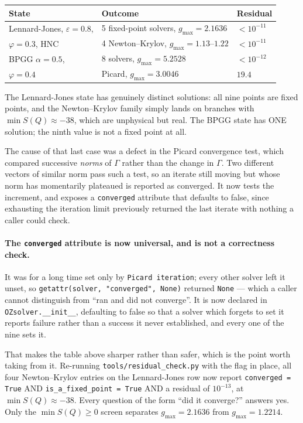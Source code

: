 \documentclass[11pt,a4paper]{article}
\newcommand{\code}[1]{\texttt{\hspace{0pt}#1}}
\begin{document}
\begin{center}\small
\begin{tabular}{lll}
\toprule
State & Outcome & Residual\\
\midrule
Lennard-Jones, $\varepsilon = 0.8$, & 5 fixed-point solvers, $g_{\max} = 2.1636$ & $< 10^{-11}$\\
$\varphi = 0.3$, HNC & 4 Newton--Krylov, $g_{\max} = 1.13$--$1.22$ & $< 10^{-11}$\\
\midrule
BPGG $\alpha = 0.5$, & 8 solvers, $g_{\max} = 5.2528$ & $< 10^{-12}$\\
$\varphi = 0.4$ & Picard, $g_{\max} = 3.0046$ & $\mathbf{19.4}$\\
\bottomrule
\end{tabular}
\end{center}

The Lennard-Jones state has genuinely distinct solutions: all nine points are
fixed points, and the Newton--Krylov family simply lands on branches with
$\min S(Q) \approx -38$, which are unphysical but real. The BPGG state has
ONE solution; the ninth value is not a fixed point at all.

The cause of that last case was a defect in the Picard convergence test,
which compared successive \emph{norms} of $\Gamma$ rather than the change in
$\Gamma$. Two different vectors of similar norm pass such a test, so an
iterate still moving but whose norm has momentarily plateaued is reported as
converged. It now tests the increment, and exposes a \code{converged}
attribute that defaults to false, since exhausting the iteration limit
previously returned the last iterate with nothing a caller could check.

\paragraph{The \code{converged} attribute is now universal, and is not a
correctness check.} It was for a long time set only by
\code{Picard iteration}; every other solver left it unset, so
\code{getattr(solver, "converged", None)} returned \code{None} --- which a
caller cannot distinguish from ``ran and did not converge''. It is now
declared in \code{OZsolver.\_\_init\_\_}, defaulting to false so that a
solver which forgets to set it reports failure rather than a success it never
established, and every one of the nine sets it.

That makes the table above sharper rather than safer, which is the point
worth taking from it. Re-running \code{tools/residual\_check.py} with the
flag in place, all four Newton--Krylov entries on the Lennard-Jones row now
report \code{converged = True} AND \code{is\_a\_fixed\_point = True} AND a
residual of $10^{-13}$, at $\min S(Q) \approx -38$. Every question of the
form ``did it converge?'' answers yes. Only the $\min S(Q) \ge 0$ screen
separates $g_{\max} = 2.1636$ from $g_{\max} = 1.2214$.
\end{document}
